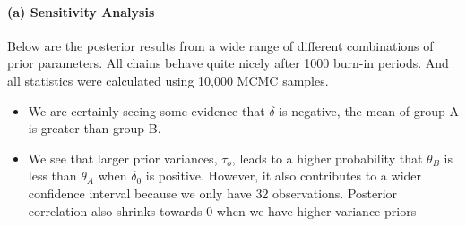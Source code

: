 \documentclass[11pt, letterpaper]{article}
\begin{document}
\paragraph{(a) Sensitivity Analysis}
Below are the posterior results from a wide range of different combinations of prior parameters. All chains behave quite nicely after 1000 burn-in periods. And all statistics were calculated using 10,000 MCMC samples.
\begin{itemize}
    \item We are certainly seeing some evidence that $\delta$ is negative, the mean of group A is greater than group B.
    \item We see that larger prior variances, $\tau_o$, leads to a higher probability that $\theta_B$ is less than $\theta_A$ when $\delta_0$ is positive. However, it also contributes to a wider confidence interval because we only have 32 observations. Posterior correlation also shrinks towards 0 when we have higher variance priors
\end{itemize}
\end{document}
